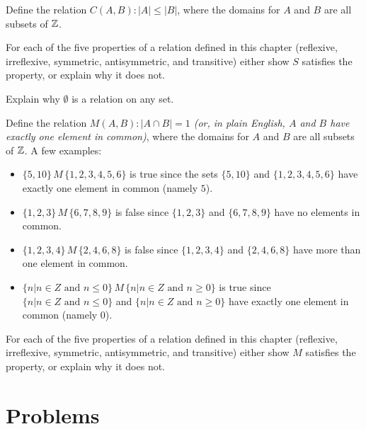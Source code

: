 \begin{exer}
Define the relation {\itshape $C(A,B) : |A|\leq|B|$}, where the
domains for $A$ and $B$ are all subsets of $\mathbb{Z}$. 

For each of the five properties of a relation defined in this chapter (reflexive, irreflexive, symmetric, antisymmetric, and transitive) 
either show $S$ satisfies the property, or explain why it does not.
\end{exer}

\begin{exer} 
Explain why $\emptyset$ is a relation on any set.
\end{exer}

\begin{exer}
Define the relation {\itshape $M(A,B) : |A\cap B| = 1$ (or, in plain English, $A$ and $B$ have exactly one element in common)}, where the
domains for $A$ and $B$ are all subsets of $\mathbb{Z}$. A few examples: 

\begin{itemize}

\item $\{5,10\}\,M\,\{ 1,2,3,4,5,6\}$ is true since the sets $\{5,10\}$
and $\{1,2,3,4,5,6\}$ have exactly one element in common (namely $5$). 

\item $\{ 1,2,3\}\,M\, \{6,7,8,9\}$ is false since  $\{ 1,2,3\}$ and $\{6,7,8,9\}$ have no elements in common.

\item $\{1,2,3,4\}\,M\, \{2,4,6,8\}$ is false since $\{1,2,3,4\}$ and $\{2,4,6,8\}$ have more than one element in common.

\item $\{n | n \in Z \text{ and } n\leq 0\} \, M\, \{n | n \in Z \text{ and } n\geq 0\}$ is true since $\{n | n \in Z \text{ and } n\leq 0\}$
and  $\{n | n \in Z \text{ and } n\geq 0\}$ have exactly one element in common (namely $0$).

\end{itemize}


For each of the five properties of a relation defined in this chapter (reflexive, irreflexive, symmetric, antisymmetric, and transitive) 
either show $M$ satisfies the property, or explain why it does not.
\end{exer}

\clearpage

\section{Problems}

